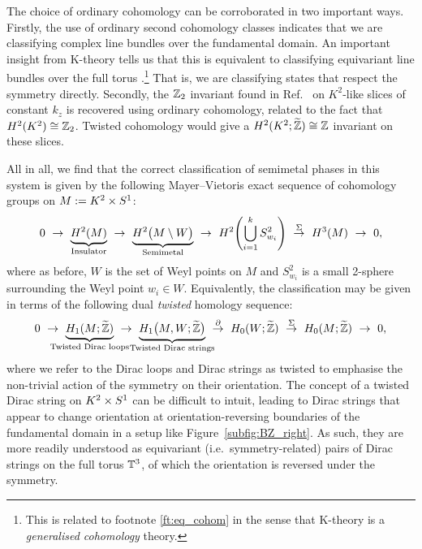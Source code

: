 The choice of ordinary cohomology can be corroborated in two important ways. Firstly, the use of ordinary second cohomology classes indicates that we are classifying complex line bundles over the fundamental domain. An important insight from K-theory tells us that this is equivalent to classifying equivariant line bundles over the full torus \parencite[Proposition 2.1]{Segal_K-theory}.\footnote{
	This is related to footnote \ref{ft:eq_cohom} in the sense that K-theory is a \emph{generalised cohomology} theory.}
That is, we are classifying states that respect the symmetry directly. Secondly, the $\mathbb{Z}_2$ invariant found in Ref.~\cite{Fonseca-Vaidya_nonorientable} on $K^2$-like slices of constant $k_z$ is recovered using ordinary cohomology, related to the fact that $H^2(K^2)\cong\mathbb{Z}_2$. Twisted cohomology would give a $H^2(K^2;\widetilde{\mathbb{Z}})\cong\mathbb{Z}$ invariant on these slices.

All in all, we find that the correct classification of semimetal phases in this system is given by the following Mayer--Vietoris exact sequence of cohomology groups on $M := K^2\times S^1$:
\begin{equation}\label{eq:MV-nonorientable}
	0\ \to\ \underbrace{H^2(M)}_{\mathclap{\text{Insulator}}}\ \to\ \underbrace{H^2\big(M\setminus W\big)}_{\mathclap{\text{Semimetal}}}\ \to\ H^2\!\left(\bigcup_{i=1}^k S_{w_i}^2\right)\ \overset{\Sigma}{\to}\ H^3(M)\ \to\ 0,
\end{equation}
where as before, $W$ is the set of Weyl points on $M$ and $S_{w_i}^2$ is a small 2-sphere surrounding the Weyl point $w_i\in W$. Equivalently, the classification may be given in terms of the following dual \emph{twisted} homology sequence:
\begin{equation}\label{eq:homology-sequence-nonorientable}
	0\ \to\ \underbrace{H_1(M;\ext{\Z})}_{\mathclap{\text{Twisted Dirac loops}}}\ \to\ \underbrace{H_1\big(M, W;\ext{\Z}\big)}_{\mathclap{\text{Twisted Dirac strings}}}\ \overset{\partial}{\to}\ H_0(W;\ext{\Z})\ \overset{\Sigma}{\to}\ H_0(M;\ext{\Z})\ \to\ 0,
\end{equation}
where we refer to the Dirac loops and Dirac strings as twisted to emphasise the non-trivial action of the symmetry on their orientation. The concept of a twisted Dirac string on $K^2\times S^1$ can be difficult to intuit, leading to Dirac strings that appear to change orientation at orientation-reversing boundaries of the fundamental domain in a setup like Figure~\ref{subfig:BZ_right}. As such, they are more readily understood as equivariant (i.e.\ symmetry-related) pairs of Dirac strings on the full torus $\mathbb{T}^3$, of which the orientation is reversed under the symmetry.

